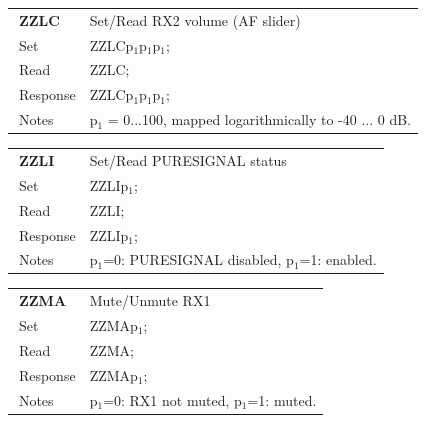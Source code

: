 \documentclass[12pt]{book}
\begin{document}
\begin{center}
\begin{tabular}{|p{2cm}|p{11cm}|}
\toprule
$\phantom{\Big|}$\textbf{\large ZZLC} & Set/Read RX2 volume (AF slider) \\\cline{1-2}
$\phantom{\Big|}${\large Set} & {ZZLCp$_1$p$_1$p$_1$;} \\\hline
$\phantom{\Big|}${\large Read} & {ZZLC;} \\\hline
$\phantom{\Big|}${\large Response} & {ZZLCp$_1$p$_1$p$_1$;} \\\hline
$\phantom{\Big|}${\large Notes} & \multicolumn{1}{|p{11cm}|}{p$_1$ = 0...100, mapped logarithmically to -40 ... 0 dB.} \\
\bottomrule
\end{tabular}
\end{center}

\begin{center}
\begin{tabular}{|p{2cm}|p{11cm}|}
\toprule
$\phantom{\Big|}$\textbf{\large ZZLI} & Set/Read PURESIGNAL status \\\cline{1-2}
$\phantom{\Big|}${\large Set} & {ZZLIp$_1$;} \\\hline
$\phantom{\Big|}${\large Read} & {ZZLI;} \\\hline
$\phantom{\Big|}${\large Response} & {ZZLIp$_1$;} \\\hline
$\phantom{\Big|}${\large Notes} & \multicolumn{1}{|p{11cm}|}{p$_1$=0: PURESIGNAL disabled, p$_1$=1: enabled.} \\
\bottomrule
\end{tabular}
\end{center}

\begin{center}
\begin{tabular}{|p{2cm}|p{11cm}|}
\toprule
$\phantom{\Big|}$\textbf{\large ZZMA} & Mute/Unmute RX1 \\\cline{1-2}
$\phantom{\Big|}${\large Set} & {ZZMAp$_1$;} \\\hline
$\phantom{\Big|}${\large Read} & {ZZMA;} \\\hline
$\phantom{\Big|}${\large Response} & {ZZMAp$_1$;} \\\hline
$\phantom{\Big|}${\large Notes} & \multicolumn{1}{|p{11cm}|}{p$_1$=0: RX1 not muted, p$_1$=1: muted.} \\
\bottomrule
\end{tabular}
\end{center}
\end{document}
